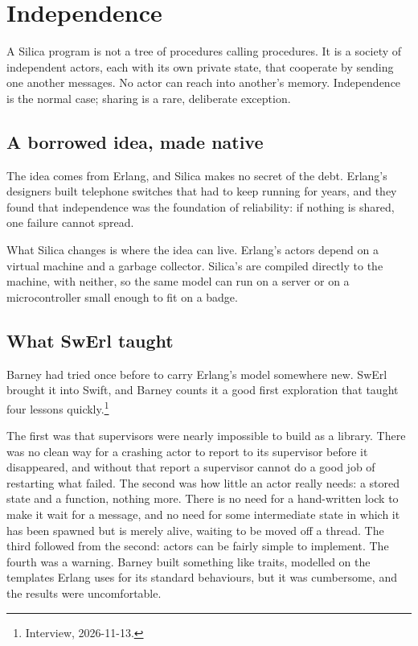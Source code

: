 \chapter{Independence}
\label{ch:actors}

A Silica program is not a tree of procedures calling procedures. It is a
society of independent actors, each with its own private state, that cooperate
by sending one another messages. No actor can reach into another's memory.
Independence is the normal case; sharing is a rare, deliberate exception.

\section{A borrowed idea, made native}

The idea comes from Erlang, and Silica makes no secret of the debt. Erlang's
designers built telephone switches that had to keep running for years, and they
found that independence was the foundation of reliability: if nothing is
shared, one failure cannot spread.

What Silica changes is where the idea can live. Erlang's actors depend on a
virtual machine and a garbage collector. Silica's are compiled directly to the
machine, with neither, so the same model can run on a server or on a
microcontroller small enough to fit on a badge.

\section{What SwErl taught}

Barney had tried once before to carry Erlang's model somewhere new. SwErl
brought it into Swift, and Barney counts it a good first exploration that taught
four lessons quickly.\footnote{Interview, 2026-11-13.}

The first was that supervisors were nearly impossible to build as a library.
There was no clean way for a crashing actor to report to its supervisor before
it disappeared, and without that report a supervisor cannot do a good job of
restarting what failed. The second was how little an actor really needs: a
stored state and a function, nothing more. There is no need for a hand-written
lock to make it wait for a message, and no need for some intermediate state in
which it has been spawned but is merely alive, waiting to be moved off a thread.
The third followed from the second: actors can be fairly simple to implement.
The fourth was a warning. Barney built something like traits, modelled on the
templates Erlang uses for its standard behaviours, but it was cumbersome, and
the results were uncomfortable.

